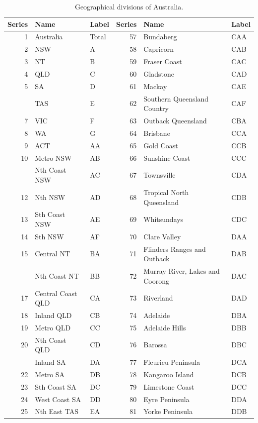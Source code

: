 \documentclass[
  11pt,
  letterpaper,
  DIV=11,
  numbers=noendperiod,
  titlepage]{scrartcl}
\begin{document}
\begin{longtable}[t]{rllrll}

\caption{\label{tbl-tourism-geo}Geographical divisions of Australia.}

\tabularnewline

\toprule
Series & Name & Label & Series & Name & Label\\
\midrule
1 & Australia & Total & 57 & Bundaberg & CAA\\
2 & NSW & A & 58 & Capricorn & CAB\\
3 & NT & B & 59 & Fraser Coast & CAC\\
4 & QLD & C & 60 & Gladstone & CAD\\
5 & SA & D & 61 & Mackay & CAE\\
\addlinespace
6 & TAS & E & 62 & Southern Queensland Country & CAF\\
7 & VIC & F & 63 & Outback Queensland & CBA\\
8 & WA & G & 64 & Brisbane & CCA\\
9 & ACT & AA & 65 & Gold Coast & CCB\\
10 & Metro NSW & AB & 66 & Sunshine Coast & CCC\\
\addlinespace
11 & Nth Coast NSW & AC & 67 & Townsville & CDA\\
12 & Nth NSW & AD & 68 & Tropical North Queensland & CDB\\
13 & Sth Coast NSW & AE & 69 & Whitsundays & CDC\\
14 & Sth NSW & AF & 70 & Clare Valley & DAA\\
15 & Central NT & BA & 71 & Flinders Ranges and Outback & DAB\\
\addlinespace
16 & Nth Coast NT & BB & 72 & Murray River, Lakes and Coorong & DAC\\
17 & Central Coast QLD & CA & 73 & Riverland & DAD\\
18 & Inland QLD & CB & 74 & Adelaide & DBA\\
19 & Metro QLD & CC & 75 & Adelaide Hills & DBB\\
20 & Nth Coast QLD & CD & 76 & Barossa & DBC\\
\addlinespace
21 & Inland SA & DA & 77 & Fleurieu Peninsula & DCA\\
22 & Metro SA & DB & 78 & Kangaroo Island & DCB\\
23 & Sth Coast SA & DC & 79 & Limestone Coast & DCC\\
24 & West Coast SA & DD & 80 & Eyre Peninsula & DDA\\
25 & Nth East TAS & EA & 81 & Yorke Peninsula & DDB\\

\end{longtable}
\end{document}
